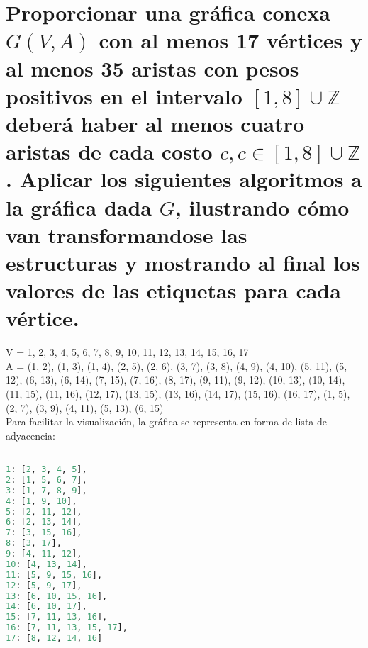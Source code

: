 \section{Proporcionar una gráfica conexa $G(V, A)$ con al menos 17 vértices y al menos 35 aristas con pesos positivos en el intervalo $[1, 8] \cup \mathbb{Z}$ deberá haber al menos cuatro aristas de cada costo $c, c \in [1, 8] \cup \mathbb{Z}$. Aplicar los siguientes algoritmos a la gráfica dada $G$, ilustrando cómo van transformandose las estructuras y mostrando al final los valores de las etiquetas para cada vértice.}

V = {1, 2, 3, 4, 5, 6, 7, 8, 9, 10, 11, 12, 13, 14, 15, 16, 17}\\

A = {(1, 2), (1, 3), (1, 4), (2, 5), (2, 6), (3, 7), (3, 8), (4, 9), (4, 10), (5, 11), (5, 12), (6, 13), (6, 14), (7, 15), (7, 16), (8, 17), (9, 11), (9, 12), (10, 13), (10, 14), (11, 15), (11, 16), (12, 17), (13, 15), (13, 16), (14, 17), (15, 16), (16, 17), (1, 5), (2, 7), (3, 9), (4, 11), (5, 13), (6, 15)}\\

Para facilitar la visualización, la gráfica se representa en forma de lista de adyacencia:

\begin{lstlisting}[language = python]

1: [2, 3, 4, 5],
2: [1, 5, 6, 7],
3: [1, 7, 8, 9],
4: [1, 9, 10],
5: [2, 11, 12],
6: [2, 13, 14],
7: [3, 15, 16],
8: [3, 17],
9: [4, 11, 12],
10: [4, 13, 14],
11: [5, 9, 15, 16],
12: [5, 9, 17],
13: [6, 10, 15, 16],
14: [6, 10, 17],
15: [7, 11, 13, 16],
16: [7, 11, 13, 15, 17],
17: [8, 12, 14, 16]

\end{lstlisting}

\begin{enumerate}



\end{enumerate}

